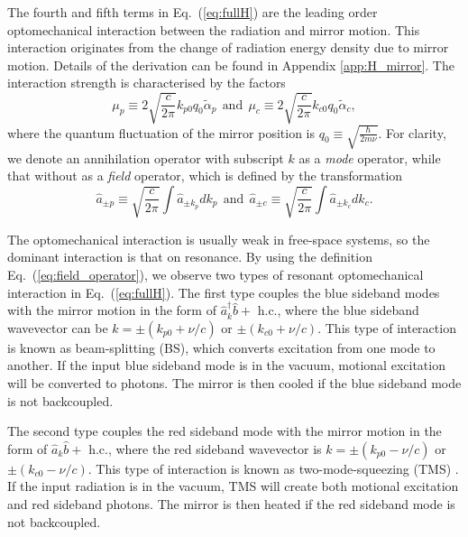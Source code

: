 \documentclass[aps, pra, reprint, amsmath, amssymb, groupedaddress, acknowledgments]{revtex4-1}
\begin{document}
The fourth and fifth terms in Eq.~(\ref{eq:fullH}) are the leading order optomechanical interaction between the radiation and mirror motion.  This interaction originates from the change of radiation energy density due to mirror motion.  Details of the derivation can be found in Appendix \ref{app:H_mirror}.  The interaction strength is characterised by the factors 
\begin{equation}\label{eq:def_mu}
\mu_p \equiv 2 \sqrt{\frac{c}{2 \pi}} k_{p0} q_0 \tilde{\alpha}_p~~\textrm{and}~~
\mu_c \equiv 2 \sqrt{\frac{c}{2 \pi}} k_{c0} q_0 \tilde{\alpha}_c,
\end{equation}
where the quantum fluctuation of the mirror position is $q_0\equiv \sqrt{\frac{\hbar}{2m\nu}}$.  
For clarity, we denote an annihilation operator with subscript $k$ as a \textit{mode} operator, while that without as a \textit{field} operator, which is defined by the transformation
\begin{equation}
\hat{a}_{\pm p} \equiv \sqrt{\frac{c}{2 \pi}} \int \hat{a}_{\pm k_p} dk_p~~\textrm{and}~~\hat{a}_{\pm c} \equiv \sqrt{\frac{c}{2 \pi}} \int \hat{a}_{\pm k_c} dk_c. \label{eq:field_operator}
\end{equation}

The optomechanical interaction is usually weak in free-space systems, so the dominant interaction is that on resonance.
By using the definition Eq.~(\ref{eq:field_operator}), we observe two types of resonant optomechanical interaction in Eq.~(\ref{eq:fullH}).  The first type couples the blue sideband modes with the mirror motion in the form of $\hat{a}_{k}^\dag \hat{b} +$ h.c., where the blue sideband wavevector can be $k= \pm(k_{p0}+\nu/c)$ or $\pm(k_{c0}+\nu/c)$.  This type of interaction is known as beam-splitting (BS), which converts excitation from one mode to another.  If the input blue sideband mode is in the vacuum, motional excitation will be converted to photons.  The mirror is then cooled if the blue sideband mode is not backcoupled.

The second type couples the red sideband mode with the mirror motion in the form of $\hat{a}_{k} \hat{b} +$ h.c., where the red sideband wavevector is $k=\pm(k_{p0}-\nu/c)$ or $\pm(k_{c0}-\nu/c)$.  This type of interaction is known as two-mode-squeezing (TMS) \cite{Weedbrook:2012fe}.  If the input radiation is in the vacuum, TMS will create both motional excitation and red sideband photons.  The mirror is then heated if the red sideband mode is not backcoupled.
\end{document}
